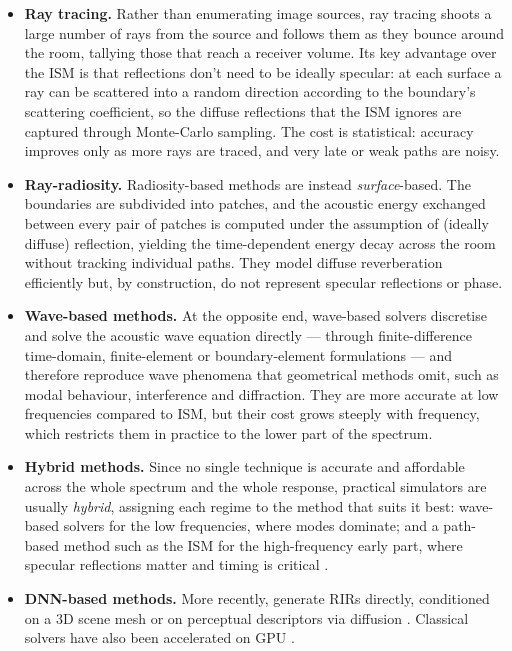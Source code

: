 \begin{itemize}
\item \textbf{Ray tracing.} Rather than enumerating image sources, ray tracing
shoots a large number of rays from the source and follows
them as they bounce around the room, tallying those that reach a receiver
volume. Its key advantage over the \acrshort{ISM} is that reflections don't need to be ideally specular: at each surface a ray can be scattered into a
random direction according to the boundary's scattering coefficient, so the
diffuse reflections that the \acrshort{ISM} ignores are captured through
Monte-Carlo sampling. The cost is statistical: accuracy improves only as
more rays are traced, and very late or weak paths are noisy.

\item \textbf{Ray-radiosity.} Radiosity-based methods are instead
\emph{surface}-based. The boundaries are subdivided into patches, and the
acoustic energy exchanged between every pair of patches is computed under
the assumption of (ideally diffuse) reflection, yielding the time-dependent
energy decay across the room without tracking individual paths. They model
diffuse reverberation efficiently but, by construction, do not represent
specular reflections or phase.

\item \textbf{Wave-based methods.} At the opposite end, wave-based solvers
discretise and solve the acoustic wave equation directly --- through
finite-difference time-domain, finite-element or boundary-element
formulations --- and therefore reproduce wave phenomena that geometrical
methods omit, such as modal behaviour, interference and diffraction. They
are more accurate at low frequencies compared to \acrshort{ISM}, but their cost grows
steeply with frequency, which
restricts them in practice to the lower part of the spectrum.

\item \textbf{Hybrid methods.} Since no single technique is accurate and
affordable across the whole spectrum and the whole response, practical
simulators are usually \emph{hybrid}, assigning each regime to the method
that suits it best: wave-based solvers for the low frequencies, where modes
dominate; and a path-based method such as the \acrshort{ISM} for the
high-frequency early part, where specular reflections matter and timing is
critical \citep{tang2022gwa}.

\item \textbf{\acrshort{DNN}-based methods.} More recently,  generate \acrshort{RIR}s directly, conditioned on a 3D scene mesh \citep{ratnarajah2022mesh2ir} or on perceptual descriptors via diffusion \citep{arellano2025room}. Classical solvers have also been accelerated on GPU \citep{diaz2021gpurir}.
\end{itemize}

